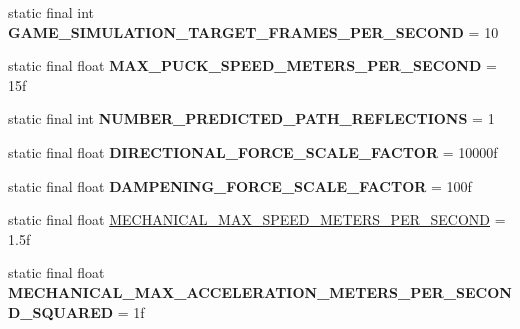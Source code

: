 \begin{DoxyCompactItemize}
\item 
\hypertarget{classairhockeyjava_1_1game_1_1_constants_ade69795703a327a810130c3c099218ed}{}static final int {\bfseries G\+A\+M\+E\+\_\+\+S\+I\+M\+U\+L\+A\+T\+I\+O\+N\+\_\+\+T\+A\+R\+G\+E\+T\+\_\+\+F\+R\+A\+M\+E\+S\+\_\+\+P\+E\+R\+\_\+\+S\+E\+C\+O\+N\+D} = 10\label{classairhockeyjava_1_1game_1_1_constants_ade69795703a327a810130c3c099218ed}

\item 
\hypertarget{classairhockeyjava_1_1game_1_1_constants_a6e985bad7f84839d21218c1f640ca444}{}static final float {\bfseries M\+A\+X\+\_\+\+P\+U\+C\+K\+\_\+\+S\+P\+E\+E\+D\+\_\+\+M\+E\+T\+E\+R\+S\+\_\+\+P\+E\+R\+\_\+\+S\+E\+C\+O\+N\+D} = 15f\label{classairhockeyjava_1_1game_1_1_constants_a6e985bad7f84839d21218c1f640ca444}

\item 
\hypertarget{classairhockeyjava_1_1game_1_1_constants_a346142f16c96e56f80e740c0a193b603}{}static final int {\bfseries N\+U\+M\+B\+E\+R\+\_\+\+P\+R\+E\+D\+I\+C\+T\+E\+D\+\_\+\+P\+A\+T\+H\+\_\+\+R\+E\+F\+L\+E\+C\+T\+I\+O\+N\+S} = 1\label{classairhockeyjava_1_1game_1_1_constants_a346142f16c96e56f80e740c0a193b603}

\item 
\hypertarget{classairhockeyjava_1_1game_1_1_constants_a84382c91ea9741b7a5bb9b13591a426c}{}static final float {\bfseries D\+I\+R\+E\+C\+T\+I\+O\+N\+A\+L\+\_\+\+F\+O\+R\+C\+E\+\_\+\+S\+C\+A\+L\+E\+\_\+\+F\+A\+C\+T\+O\+R} = 10000f\label{classairhockeyjava_1_1game_1_1_constants_a84382c91ea9741b7a5bb9b13591a426c}

\item 
\hypertarget{classairhockeyjava_1_1game_1_1_constants_ae746fb6674ade3ab40bee9ee7d5c27a0}{}static final float {\bfseries D\+A\+M\+P\+E\+N\+I\+N\+G\+\_\+\+F\+O\+R\+C\+E\+\_\+\+S\+C\+A\+L\+E\+\_\+\+F\+A\+C\+T\+O\+R} = 100f\label{classairhockeyjava_1_1game_1_1_constants_ae746fb6674ade3ab40bee9ee7d5c27a0}

\item 
static final float \hyperlink{classairhockeyjava_1_1game_1_1_constants_a178d0434800c7eb2323eaf76b0f4b447}{M\+E\+C\+H\+A\+N\+I\+C\+A\+L\+\_\+\+M\+A\+X\+\_\+\+S\+P\+E\+E\+D\+\_\+\+M\+E\+T\+E\+R\+S\+\_\+\+P\+E\+R\+\_\+\+S\+E\+C\+O\+N\+D} = 1.\+5f
\item 
\hypertarget{classairhockeyjava_1_1game_1_1_constants_a95e7d127d9cffb250db90a7ac795812e}{}static final float {\bfseries M\+E\+C\+H\+A\+N\+I\+C\+A\+L\+\_\+\+M\+A\+X\+\_\+\+A\+C\+C\+E\+L\+E\+R\+A\+T\+I\+O\+N\+\_\+\+M\+E\+T\+E\+R\+S\+\_\+\+P\+E\+R\+\_\+\+S\+E\+C\+O\+N\+D\+\_\+\+S\+Q\+U\+A\+R\+E\+D} = 1f\label{classairhockeyjava_1_1game_1_1_constants_a95e7d127d9cffb250db90a7ac795812e}


\end{DoxyCompactItemize}
